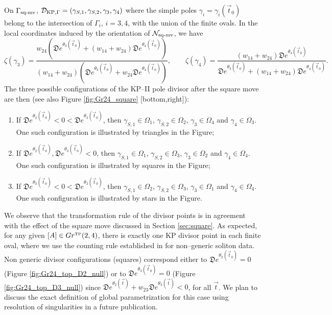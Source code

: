 \documentclass[11pt]{amsart}
\theoremstyle{plain}
\numberwithin{equation}{section}
\def \DKP {{\mathcal D}_{\textup{\scriptsize KP},\Gamma}}
\begin{document}
On $\Gamma_{\mbox{\scriptsize sq-mv}}$, $\DKP = (\gamma_{S,1} ,\gamma_{S,2},\gamma_3,\gamma_4 )$
where the simple poles $\gamma_{i}=\gamma_{i} (\vec t_0)$ belong to the intersection of 
$\Gamma_{i}$, $i=3,4$, with the union of the finite ovals. In the local coordinates induced by the orientation of ${\mathcal N}_{\mbox{\scriptsize sq-mv}}$, we have
\begin{equation}\label{eq:ex_div_square}
\zeta(\gamma_{3}) = \frac{w_{24} \left( {\mathfrak D} e^{\theta_3(\vec t_0)} + (w_{14}+ w_{24})
{\mathfrak D} e^{\theta_4(\vec t_0)}\right)}{(w_{14}+ w_{24})\left({\mathfrak D} e^{\theta_3(\vec t_0)}+ w_{24}
{\mathfrak D} e^{\theta_4(\vec t_0)}\right)}, \quad\quad   \zeta(\gamma_{4}) = \frac{(w_{14}+w_{24}){\mathfrak D} e^{\theta_4(\vec t_0)}}{{\mathfrak D} e^{\theta_3(\vec t_0)}+ (w_{14}+w_{24})
{\mathfrak D} e^{\theta_4(\vec t_0)}}.
\end{equation}
The three possible configurations of the KP--II pole divisor after the square move are  then (see also Figure \ref{fig:Gr24_square} [bottom,right]):
\begin{enumerate}
\item If ${\mathfrak D} e^{\theta_2(\vec t_0)}<0<{\mathfrak D} e^{\theta_3(\vec t_0)}$, then $\gamma_{S,1} \in \Omega_1$, $\gamma_{S,2} \in \Omega_2$, $\gamma_{3} \in \Omega_4$ and $\gamma_{4} \in \Omega_3$. One such configuration is illustrated by triangles in the Figure;
\item If ${\mathfrak D} e^{\theta_2(\vec t_0)},{\mathfrak D} e^{\theta_3(\vec t_0)}<0$, then $\gamma_{S,1} \in \Omega_1$, $\gamma_{S,2} \in \Omega_3$, $\gamma_{3} \in \Omega_2$ and $\gamma_{4} \in \Omega_4$. One such configuration is illustrated by squares in the Figure;
\item If ${\mathfrak D} e^{\theta_3(\vec t_0)}<0<{\mathfrak D} e^{\theta_2(\vec t_0)}$, then $\gamma_{S,1} \in \Omega_2$, $\gamma_{S,2} \in \Omega_3$, $\gamma_{3} \in \Omega_1$ and $\gamma_{4} \in \Omega_4$. One such configuration is illustrated by stars in the Figure.
\end{enumerate}
We observe that the transformation rule of the divisor points is in agreement with the effect of the square move discussed in Section \ref{sec:square}.
As expected, for any given $[A]\in Gr^{\mbox{\tiny TP}}(2,4)$, there is exactly one KP divisor point in each finite oval, where we use the counting rule established in \cite{AG1} for non--generic soliton data. Non generic divisor configurations (squares) correspond either to
${\mathfrak D} e^{\theta_2(\vec t_0)}=0$ (Figure \ref{fig:Gr24_top_D2_null}) or to ${\mathfrak D} e^{\theta_3(\vec t_0)}=0$ (Figure \ref{fig:Gr24_top_D3_null}) since ${\mathfrak D} e^{\theta_2(\vec t)}
+w_{23}{\mathfrak D} e^{\theta_3(\vec t)}<0$, for all $\vec t$. We plan to discuss the exact definition of global parametrization for this case using resolution of singularities in a future publication.
\end{document}
